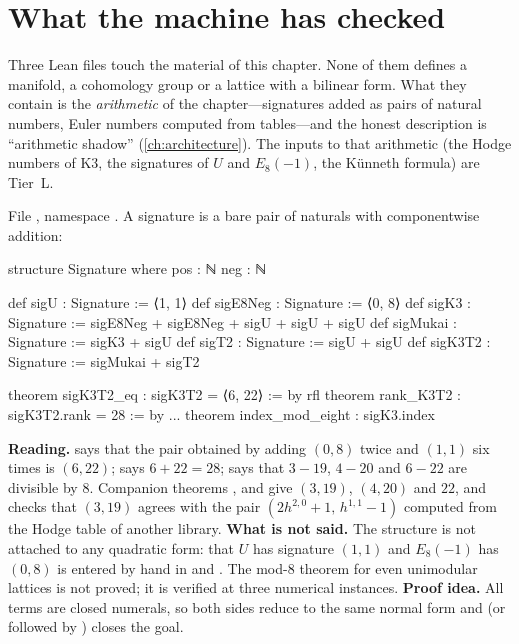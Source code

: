 \section{What the machine has checked}\label{sec:k3t2:lean}

Three Lean files touch the material of this chapter. None of them defines a manifold, a
cohomology group or a lattice with a bilinear form. What they contain is the
\emph{arithmetic} of the chapter---signatures added as pairs of natural numbers, Euler
numbers computed from tables---and the honest description is ``arithmetic shadow''
(\cref{ch:architecture}). The inputs to that arithmetic (the Hodge numbers of K3, the
signatures of $U$ and $E_8(-1)$, the K\"unneth formula) are Tier~L.

\begin{leanbox}
File , namespace
. A signature is a bare pair of naturals with componentwise
addition:
\begin{leancode}
structure Signature where
  pos : ℕ
  neg : ℕ

def sigU : Signature := ⟨1, 1⟩
def sigE8Neg : Signature := ⟨0, 8⟩
def sigK3 : Signature := sigE8Neg + sigE8Neg + sigU + sigU + sigU
def sigMukai : Signature := sigK3 + sigU
def sigT2 : Signature := sigU + sigU
def sigK3T2 : Signature := sigMukai + sigT2

theorem sigK3T2_eq : sigK3T2 = ⟨6, 22⟩ := by rfl
theorem rank_K3T2 : sigK3T2.rank = 28 := by ...
theorem index_mod_eight :
    sigK3.index %
\end{leancode}
\textbf{Reading.}  says that the pair obtained by adding $(0,8)$ twice and
$(1,1)$ six times is $(6,22)$;  says $6+22=28$;  says
that $3-19$, $4-20$ and $6-22$ are divisible by $8$. Companion theorems ,
 and  give $(3,19)$, $(4,20)$ and $22$, and
 checks that $(3,19)$ agrees with the pair
$(2h^{2,0}+1,\,h^{1,1}-1)$ computed from the Hodge table of another library.
\textbf{What is not said.} The structure  is not attached to any quadratic
form: that $U$ has signature $(1,1)$ and $E_8(-1)$ has $(0,8)$ is entered by hand in
 and . The mod-$8$ theorem for even unimodular lattices is not
proved; it is verified at three numerical instances. \textbf{Proof idea.} All terms are closed
numerals, so both sides reduce to the same normal form and  (or 
followed by ) closes the goal.
\end{leanbox}

